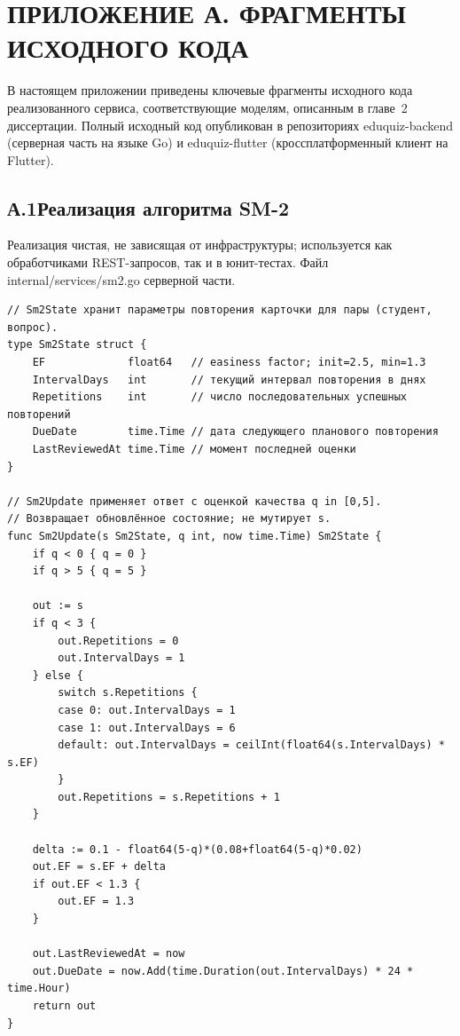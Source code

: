 \newpage
{}
\section*{ПРИЛОЖЕНИЕ А. ФРАГМЕНТЫ ИСХОДНОГО КОДА} \label{application_A}

\renewcommand{\thelstlisting}{А.\arabic{lstlisting}}
\setcounter{lstlisting}{0}
\setcounter{figure}{0}

В настоящем приложении приведены ключевые фрагменты исходного
кода реализованного сервиса, соответствующие моделям, описанным
в главе~2 диссертации. Полный исходный код опубликован в репозиториях
eduquiz-backend (серверная часть на языке Go) и
eduquiz-flutter (кроссплатформенный клиент на Flutter).

\subsection*{А.1\quad Реализация алгоритма SM-2}

Реализация чистая, не зависящая от инфраструктуры; используется
как обработчиками REST-запросов, так и в юнит-тестах. Файл
internal/services/sm2.go серверной части.

\begin{lstlisting}[caption={Алгоритм интервального повторения SM-2},label=lst:sm2-go]
// Sm2State хранит параметры повторения карточки для пары (студент, вопрос).
type Sm2State struct {
    EF             float64   // easiness factor; init=2.5, min=1.3
    IntervalDays   int       // текущий интервал повторения в днях
    Repetitions    int       // число последовательных успешных повторений
    DueDate        time.Time // дата следующего планового повторения
    LastReviewedAt time.Time // момент последней оценки
}

// Sm2Update применяет ответ с оценкой качества q in [0,5].
// Возвращает обновлённое состояние; не мутирует s.
func Sm2Update(s Sm2State, q int, now time.Time) Sm2State {
    if q < 0 { q = 0 }
    if q > 5 { q = 5 }

    out := s
    if q < 3 {
        out.Repetitions = 0
        out.IntervalDays = 1
    } else {
        switch s.Repetitions {
        case 0: out.IntervalDays = 1
        case 1: out.IntervalDays = 6
        default: out.IntervalDays = ceilInt(float64(s.IntervalDays) * s.EF)
        }
        out.Repetitions = s.Repetitions + 1
    }

    delta := 0.1 - float64(5-q)*(0.08+float64(5-q)*0.02)
    out.EF = s.EF + delta
    if out.EF < 1.3 {
        out.EF = 1.3
    }

    out.LastReviewedAt = now
    out.DueDate = now.Add(time.Duration(out.IntervalDays) * 24 * time.Hour)
    return out
}
\end{lstlisting}

